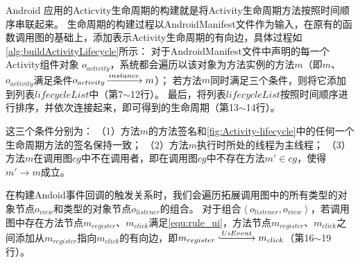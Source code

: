 	
Android 应用的Acticvity生命周期的构建就是将Activity生命周期方法按照时间顺序串联起来。%
生命周期的构建过程以AndroidManifest文件作为输入，在原有的函数调用图的基础上，添加表示Activity生命周期的有向边，具体过程如\autoref{alg:buildActivityLifecycle}所示：
对于AndroidManifest文件中声明的每一个Activity组件对象 $o_{activity}$，系统都会遍历以该对象为方法实例的方法$m$（即$m$、$o_{activity}$满足条件$o_{activity} \joinrel\xrightarrow{instance} m$）；
若方法$m$同时满足三个条件，则将它添加到列表$lifecycleList$中（第7$\sim$12行）。
最后，将列表$lifecycleList$按照时间顺序进行排序，并依次连接起来，即可得到的生命周期（第13$\sim$14行）。

这三个条件分别为：
（1）方法$m$的方法签名和\autoref{fig:Activity-lifecycle}中的任何一个生命周期方法的签名保持一致；
（2）方法$m$执行时所处的线程为主线程；
（3）方法$m$在调用图$cg$中不在调用者，即在调用图$cg$中不存在方法$m' \in cg$，使得$m' \to m $成立。



在构建Andoid事件回调的触发关系时，我们会遍历拓展调用图中的所有类型的对象节点$o_{view}$和类型的对象节点$o_{listener}$的组合。
对于组合$\left\langle o_{listener}  , o_{view}\right\rangle $，若调用图中存在方法节点$m_{register} $、$m_{click} $满足\autoref{equ:rule_ui}，方法节点$m_{register} $、$m_{click} $之间添加从$m_{register} $指向$m_{click} $的有向边，即$m_{register} \lhook\joinrel\xrightarrow{UiEvent}  m_{click}  $（第16$\sim$19行）。






